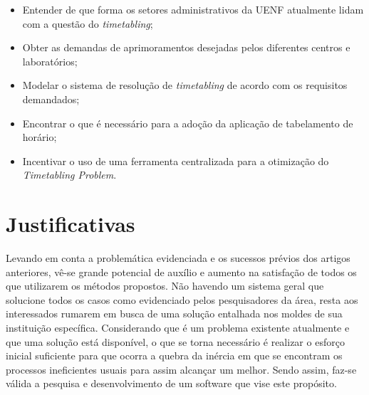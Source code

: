 \begin{itemize}
  \item Entender de que forma os setores administrativos da UENF atualmente lidam com a questão do \textit{timetabling};
  \item Obter as demandas de aprimoramentos desejadas pelos diferentes centros e laboratórios;
  \item Modelar o sistema de resolução de \textit{timetabling} de acordo com os requisitos demandados;
  \item Encontrar o que é necessário para a adoção da aplicação de tabelamento de horário;
  \item Incentivar o uso de uma ferramenta centralizada para a otimização do \textit{Timetabling Problem}.
\end{itemize}


\section{Justificativas} %

Levando em conta a problemática evidenciada e os sucessos prévios dos artigos anteriores, vê-se grande potencial de auxílio e aumento na satisfação de todos os que utilizarem os métodos propostos. Não havendo um sistema geral que solucione todos os casos como evidenciado pelos pesquisadores da área, resta aos interessados rumarem em busca de uma solução entalhada nos moldes de sua instituição específica. Considerando que é um problema existente atualmente e que uma solução está disponível, o que se torna necessário é realizar o esforço inicial suficiente para que ocorra a quebra da inércia em que se encontram os processos ineficientes usuais para assim alcançar um melhor. Sendo assim, faz-se válida a pesquisa e desenvolvimento de um software que vise este propósito.


